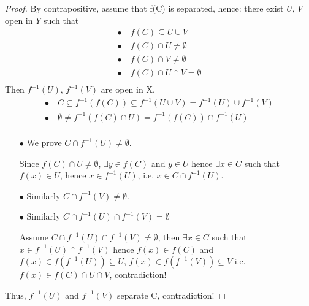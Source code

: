 \documentclass[12pt]{amsbook}
\theoremstyle{definition}
\begin{document}
\begin{proof}
By contrapositive, assume that f(C) is separated, hence: there exist $U$, $V$ open in $Y$ such that
\begin{align*}
\bullet \ & f(C) \subseteq U \cup V \\
\bullet \ & f(C) \cap U \neq \emptyset \\
\bullet \ & f(C) \cap V \neq \emptyset \\
\bullet \ & f(C) \cap U \cap V = \emptyset \\
\end{align*}
Then $f^{-1}(U)$, $f^{-1}(V)$ are open in X.
\begin{align*}
\bullet \ & C \subseteq f^{-1}(f(C)) \subseteq f^{-1}(U \cup V) = f^{-1}(U) \cup f^{-1}(V) \\
\bullet \ & \emptyset \neq f^{-1}(f(C) \cap U) = f^{-1}(f(C)) \cap f^{-1}(U) \\
\end{align*}

\begin{itemize}
\item[$\bullet$]
We prove $C \cap f^{-1}(U) \neq \emptyset$.

Since $f(C) \cap U \neq \emptyset$, $\exists y \in f(C)$ and $y \in U$ hence $\exists x \in C$ such that $f(x) \in U$, hence $x \in f^{-1}(U)$, i.e. $x \in C \cap f^{-1}(U)$.

\item[$\bullet$] Similarly $C \cap f^{-1}(V) \neq \emptyset$.

\item[$\bullet$] Similarly $C \cap f^{-1}(U) \cap f^{-1}(V) = \emptyset$


Assume $C \cap f^{-1}(U) \cap f^{-1}(V) \neq \emptyset$, then $\exists x \in C$ such that $x \in  f^{-1}(U) \cap f^{-1}(V)$ hence $f(x) \in f(C)$ and $f(x) \in f(f^{-1}(U)) \subseteq U$, $f(x) \in f(f^{-1}(V)) \subseteq V$ i.e. $f(x) \in  f(C) \cap U \cap V$, contradiction!
\end{itemize}

Thus, $f^{-1}(U)$ and $f^{-1}(V)$ separate C, contradiction!
\end{proof}
\end{document}
